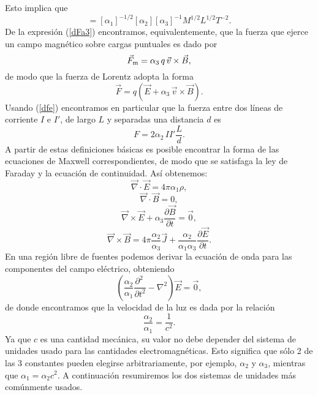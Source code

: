 Esto implica que
\begin{equation}
[B]=[\alpha_1]^{-1/2}[\alpha_2][\alpha_3]^{-1}M^{1/2}L^{1/2}T^{-2}.
\end{equation}
De la expresión (\ref{dFa3}) encontramos, equivalentemente, que la fuerza que ejerce un campo magnético sobre cargas puntuales es dado por
\begin{equation}
\vec{F}_{\rm m}=\alpha_3\, q\,\vec{v}\times\vec{B},
\end{equation} 
de modo que la fuerza de Lorentz adopta la forma
\begin{equation}
 \vec{F}=q\left(\vec{E}+\alpha_3\,\vec{v}\times\vec{B}\right).
\end{equation} 
Usando (\ref{dfe}) encontramos en particular que la fuerza entre dos líneas de corriente $I$ e $I'$, de largo $L$ y separadas una distancia $d$ es
\begin{equation}
 F=2\alpha_2\,II' \frac{L}{d}.
\end{equation} 
A partir de estas definiciones básicas es posible encontrar la forma de las ecuaciones de Maxwell correspondientes, de modo que se satisfaga la ley de Faraday y la ecuación de continuidad. Así obtenemos:
\begin{equation}
 \vec{\nabla}\cdot\vec{E}=4\pi\alpha_1\rho,
\end{equation} 
\begin{equation}
 \vec{\nabla}\cdot\vec{B}=0,
\end{equation} 
\begin{equation}
 \vec{\nabla}\times\vec{E}+\alpha_3\frac{\partial\vec{B}}{\partial t}=\vec{0},
\end{equation} 
\begin{equation}
 \vec{\nabla}\times\vec{B}=4\pi\frac{\alpha_2}{\alpha_3}\vec{J}+\frac{\alpha_2}{\alpha_1\alpha_3}\frac{
\partial\vec{E}}{\partial t}.
\end{equation} 
En una región libre de fuentes podemos derivar la ecuación de onda para las componentes del campo eléctrico, obteniendo
\begin{equation}
 \left(\frac{\alpha_2}{\alpha_1}\frac{\partial^2\
}{\partial t^2}-\nabla^2\right)\vec{E} =\vec {0},
\end{equation}
de donde encontramos que la velocidad de la luz es dada por la relación
 \begin{equation}
\frac{\alpha_2}{\alpha_1}=\frac{1}{c^2}.
 \end{equation} 
Ya que $c$ es una cantidad mecánica, su valor no debe depender del sistema de unidades usado para las cantidades electromagnéticas. Esto significa que sólo 2 de las 3 constantes pueden elegirse arbitrariamente, por ejemplo, $\alpha_2$ y $\alpha_3$, mientras que $\alpha_1=\alpha_2c^2$. A continuación resumiremos los dos sistemas de unidades más comúnmente usados.


